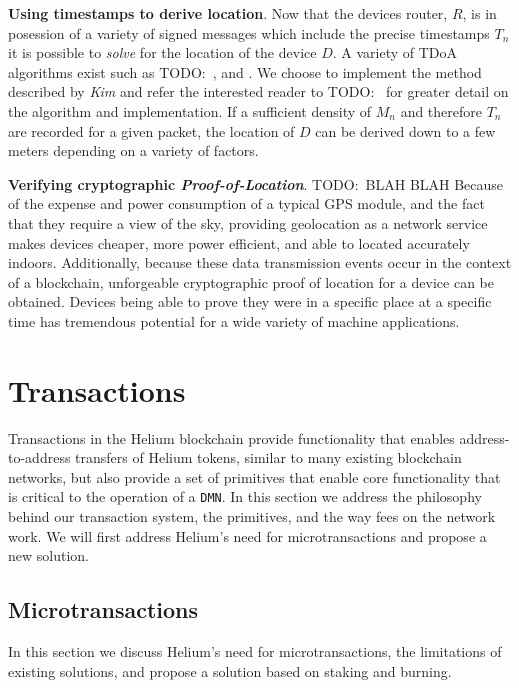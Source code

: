 \documentclass[UTF8, 10pt, nonatbib, nocopyrightspace, reprint]{sigplanconf}
\newcommand{\todo}[1]{}
\renewcommand{\todo}[1]{{\color{red} TODO:\ {#1}}}
\begin{document}
\textbf{Using timestamps to derive location}. Now that the devices router, $R$, is in posession of a variety of signed messages which include the precise timestamps $T_n$ it is possible to \emph{solve} for the location of the device $D$. A variety of TDoA algorithms exist such as \todo{\cite{}, \cite{} and \cite{}}. We choose to implement the method described by \emph{Kim} and refer the interested reader to \todo{\cite{}} for greater detail on the algorithm and implementation. If a sufficient density of $M_n$ and therefore $T_n$ are recorded for a given packet, the location of $D$ can be derived down to a few meters depending on a variety of factors.

\textbf{Verifying cryptographic \emph{Proof-of-Location}}. \todo{BLAH BLAH Because of the expense and power consumption of a typical GPS module, and the fact that they require a view of the sky, providing geolocation as a network service makes devices cheaper, more power efficient, and able to located accurately indoors. Additionally, because these data transmission events occur in the context of a blockchain, unforgeable cryptographic proof of location for a device can be obtained. Devices being able to prove they were in a specific place at a specific time has tremendous potential for a wide variety of machine applications.}

\section{Transactions}\label{transactions}

Transactions in the Helium blockchain provide functionality that enables address-to-address transfers of Helium tokens, similar to many existing blockchain networks, but also provide a set of primitives that enable core functionality that is critical to the operation of a \verb|DMN|. In this section we address the philosophy behind our transaction system, the primitives, and the way fees on the network work. We will first address Helium's need for microtransactions and propose a new solution.

\subsection{Microtransactions} \label{microtransactions}

In this section we discuss Helium's need for microtransactions, the limitations of existing solutions, and propose a solution based on staking and burning.
\end{document}
